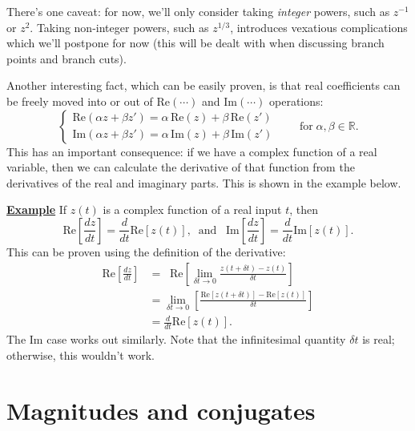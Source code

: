 \documentclass[10pt,a4paper]{article}
\begin{document}
There's one caveat: for now, we'll only consider taking \emph{integer}
powers, such as $z^{-1}$ or $z^2$. Taking non-integer powers, such as
$z^{1/3}$, introduces vexatious complications which we'll postpone for
now (this will be dealt with when discussing branch points and branch
cuts).

Another interesting fact, which can be easily proven, is that real
coefficients can be freely moved into or out of $\textrm{Re}(\cdots)$
and $\textrm{Im}(\cdots)$ operations:
\begin{equation}
\left\{\begin{array}{l}\mathrm{Re}(\alpha z + \beta z') = \alpha \, \mathrm{Re}(z) + \beta\, \mathrm{Re}(z')\\ \mathrm{Im}(\alpha z + \beta z') = \alpha \, \mathrm{Im}(z) + \beta\, \mathrm{Im}(z')\end{array}\right.\qquad\mathrm{for}\;\alpha, \beta \in \mathbb{R}.
\end{equation}
This has an important consequence: if we have a complex function of a
real variable, then we can calculate the derivative of that function
from the derivatives of the real and imaginary parts.  This is shown
in the example below.

\begin{framed}
\noindent
\underline{\textbf{Example}}
\vskip 0.1in \noindent
If $z(t)$ is a complex function of a real input $t$, then
\begin{equation}
  \mathrm{Re}\left[\frac{dz}{dt}\right] = \frac{d}{dt} \mathrm{Re}\left[z(t)\right], \;\;\textrm{and}\;\;\; \mathrm{Im}\left[\frac{dz}{dt}\right] = \frac{d}{dt} \mathrm{Im}\left[z(t)\right].
\end{equation}
This can be proven using the definition of the derivative:
\begin{align*}
  \mathrm{Re}\left[\frac{dz}{dt}\right] &= \;\; \mathrm{Re}\left[\lim_{\delta t \rightarrow 0} \frac{z(t+\delta t) - z(t)}{\delta t}\right] \\
  &= \lim_{\delta t \rightarrow 0} \left[\frac{\mathrm{Re}[z(t+\delta t)] - \mathrm{Re}[z(t)]}{\delta t}\right] \\
  &= \frac{d}{dt} \mathrm{Re}\left[z(t)\right].
\end{align*}
The $\mathrm{Im}$ case works out similarly. Note that the
infinitesimal quantity $\delta t$ is real; otherwise, this wouldn't
work.
\end{framed}

\section{Magnitudes and conjugates}\label{magnitudes-and-conjugates}
\end{document}
